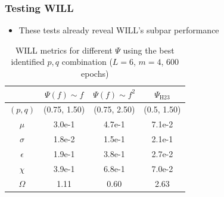 \documentclass{beamer}
\begin{document}
\begin{frame}
\frametitle{Testing WILL}
\begin{itemize}
\item These tests already reveal WILL's \alert{subpar performance}
\end{itemize}
\vspace{1cm}
\begin{table}
\centering
\begin{tabular}{c || c| c | c }
& $\Psi(f)\sim f$ & $\Psi(f) \sim f^2$ & $\Psi_\text{H23}$  \\ \hline \hline 
$(p,q)$ & (0.75, 1.50) & (0.75, 2.50) & (0.5, 1.50) \\  
$\mu$ & 3.0e-1  & 4.7e-1 & 7.1e-2 \\
$\sigma$ &  1.8e-2 & 1.5e-1 & 2.1e-1\\
$\epsilon$  &  1.9e-1  & 3.8e-1 & 2.7e-2\\
$\chi$ &  3.9e-1 &  6.8e-1 & 7.0e-2 \\ \hline
$\Omega$ &  1.11 &   0.60 & 2.63
\end{tabular}
\caption{WILL metrics for different $\Psi$ using the best identified $p, q$ combination ($L=6$, $m=4$, 600 epochs)}
\end{table}
\end{frame}
\end{document}
